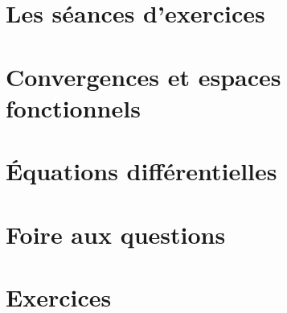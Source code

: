 

\chapter*{Les séances d'exercices}


\chapter{Convergences et espaces fonctionnels}
	

\chapter{Équations différentielles}
	


\chapter{Foire aux questions}
	

\chapter{Exercices}
	
	
